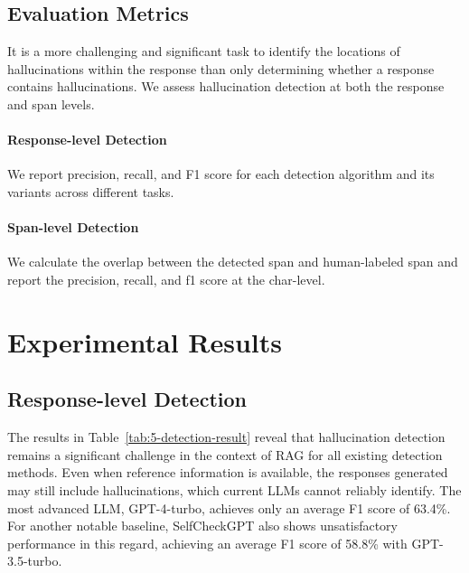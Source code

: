 \documentclass[11pt]{article}
\begin{document}
\subsection{Evaluation Metrics}
It is a more challenging and significant task to identify the locations of hallucinations within the response than only determining whether a response contains hallucinations. We assess hallucination detection at both the response and span levels.

\paragraph{Response-level Detection} We report precision, recall, and F1 score for each detection algorithm and its variants across different tasks.
\paragraph{Span-level Detection} We calculate the overlap between the detected span and human-labeled span and report the precision, recall, and f1 score at the char-level.

\section{Experimental Results} 

\subsection{Response-level Detection}
The results in Table~\ref{tab:5-detection-result} reveal that hallucination detection remains a significant challenge in the context of RAG for all existing detection methods. Even when reference information is available, the responses generated may still include hallucinations, which current LLMs cannot reliably identify. The most advanced LLM, GPT-4-turbo, achieves only an average F1 score of 63.4\%. For another notable baseline, SelfCheckGPT also shows unsatisfactory performance in this regard, achieving an average F1 score of 58.8\% with GPT-3.5-turbo.
\end{document}

